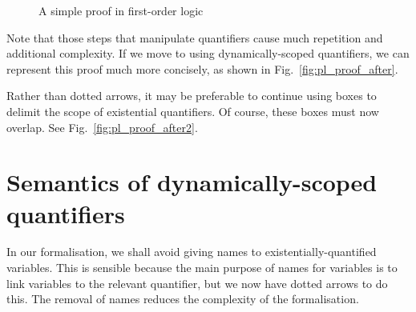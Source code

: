 \documentclass[svgnames]{llncs}
\begin{document}
\begin{figure}
\begin{center}
\begin{minipage}{2.5in}
\begin{center}
{
}
\end{center}
\end{minipage}
\end{center}
\caption{A simple proof in first-order logic}
\label{fig:pl_proof}
\end{figure}

Note that those steps that manipulate quantifiers cause much repetition and additional complexity. If we move to using dynamically-scoped quantifiers, we can represent this proof much more concisely, as shown in  Fig.~\ref{fig:pl_proof_after}.

Rather than dotted arrows, it may be preferable to continue using boxes to delimit the scope of existential quantifiers. Of course, these boxes must now overlap. See Fig.~\ref{fig:pl_proof_after2}.


\clearpage
\section{Semantics of dynamically-scoped quantifiers}\label{sect:semantics}

In our formalisation, we shall avoid giving names to existentially-quantified variables. This is sensible because the main purpose of names for variables is to link variables to the relevant quantifier, but we now have dotted arrows to do this. The removal of names reduces the complexity of the formalisation.
\end{document}
